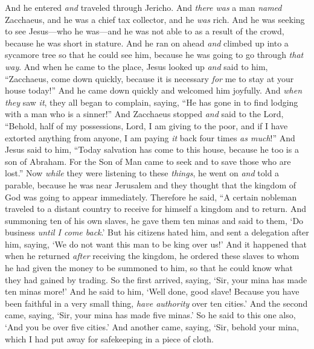 \begin{biblechapter} %
 And he entered \textit{and} traveled through Jericho.
\verse And \textit{there was} a man \textit{named} Zacchaeus, and he was a chief tax collector, and he \textit{was} rich.
\verse And he was seeking to see Jesus—who he was—and he was not able to as a result of the crowd, because he was short in stature.
\verse And he ran on ahead \textit{and} climbed up into a sycamore tree so that he could see him, because he was going to go through \textit{that way}.
\verse And when he came to the place, Jesus looked up \textit{and} said to him, “Zacchaeus, come down quickly, because it is necessary \textit{for} me to stay at your house today!”
\verse And he came down quickly and welcomed him joyfully.
\verse And \textit{when they} saw \textit{it}, they all began to complain, saying, “He has gone in to find lodging with a man who is a sinner!”
\verse And Zacchaeus stopped \textit{and} said to the Lord, “Behold, half of my possessions, Lord, I am giving to the poor, and if I have extorted anything from anyone, I am paying \textit{it} back four times \textit{as much}!”
\verse And Jesus said to him, “Today salvation has come to this house, because he too is a son of Abraham.
\verse For the Son of Man came to seek and to save those who are lost.”
 Now \textit{while} they were listening to these \textit{things}, he went on \textit{and} told a parable, because he was near Jerusalem and they thought that the kingdom of God was going to appear immediately.
\verse Therefore he said, “A certain nobleman traveled to a distant country to receive for himself a kingdom and to return.
\verse And summoning ten of his own slaves, he gave them ten minas and said to them, ‘Do business \textit{until I come back}.’
\verse But his citizens hated him, and sent a delegation after him, saying, ‘We do not want this man to be king over us!’
\verse And it happened that when he returned \textit{after} receiving the kingdom, he ordered these slaves to whom he had given the money to be summoned to him, so that he could know what they had gained by trading.
\verse So the first arrived, saying, ‘Sir, your mina has made ten minas more!’
\verse And he said to him, ‘Well done, good slave! Because you have been faithful in a very small thing, \textit{have authority} over ten cities.’
\verse And the second came, saying, ‘Sir, your mina has made five minas.’
\verse So he said to this one also, ‘And you be over five cities.’
\verse And another came, saying, ‘Sir, behold your mina, which I had put away for safekeeping in a piece of cloth.

\end{biblechapter}
